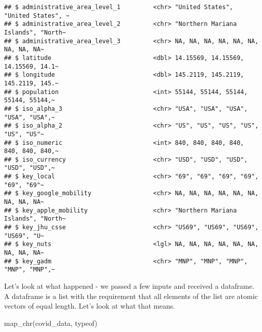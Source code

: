 \documentclass[
]{book}
\newenvironment{Shaded}{\begin{snugshade}}{\end{snugshade}}
\newcommand{\FunctionTok}[1]{\textcolor[rgb]{0.00,0.00,0.00}{#1}}
\newcommand{\NormalTok}[1]{#1}
\begin{document}
\begin{verbatim}
## $ administrative_area_level_1         <chr> "United States", "United States", ~
## $ administrative_area_level_2         <chr> "Northern Mariana Islands", "North~
## $ administrative_area_level_3         <chr> NA, NA, NA, NA, NA, NA, NA, NA, NA~
## $ latitude                            <dbl> 14.15569, 14.15569, 14.15569, 14.1~
## $ longitude                           <dbl> 145.2119, 145.2119, 145.2119, 145.~
## $ population                          <int> 55144, 55144, 55144, 55144, 55144,~
## $ iso_alpha_3                         <chr> "USA", "USA", "USA", "USA", "USA",~
## $ iso_alpha_2                         <chr> "US", "US", "US", "US", "US", "US"~
## $ iso_numeric                         <int> 840, 840, 840, 840, 840, 840, 840,~
## $ iso_currency                        <chr> "USD", "USD", "USD", "USD", "USD",~
## $ key_local                           <chr> "69", "69", "69", "69", "69", "69"~
## $ key_google_mobility                 <chr> NA, NA, NA, NA, NA, NA, NA, NA, NA~
## $ key_apple_mobility                  <chr> "Northern Mariana Islands", "North~
## $ key_jhu_csse                        <chr> "US69", "US69", "US69", "US69", "U~
## $ key_nuts                            <lgl> NA, NA, NA, NA, NA, NA, NA, NA, NA~
## $ key_gadm                            <chr> "MNP", "MNP", "MNP", "MNP", "MNP",~
\end{verbatim}

Let's look at what happened - we passed a few inputs and received a dataframe. A dataframe is a list with the requirement that all elements of the list are atomic vectors of equal length. Let's look at what that means.

\begin{Shaded}
\begin{Highlighting}[]
\FunctionTok{map\_chr}\NormalTok{(covid\_data, typeof)}
\end{Highlighting}
\end{Shaded}
\end{document}
